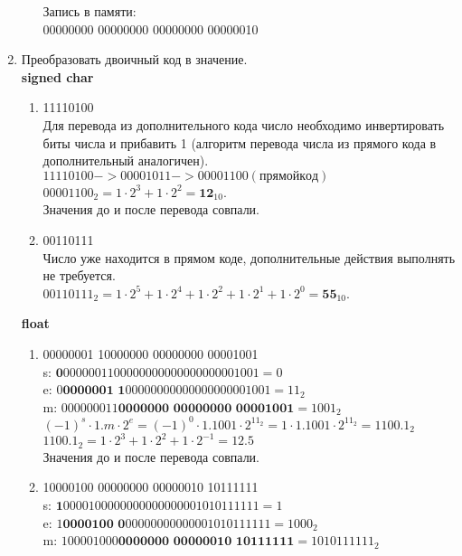 \documentclass[a4paper,14pt]{extarticle}
\begin{document}
\begin{enumerate}
\begin{enumerate}[1. ]
  Запись в памяти:\\
  00000000 00000000 00000000 00000010
\end{enumerate}
\item Преобразовать двоичный код в значение.\\
\textbf{signed char}
\begin{enumerate}[1. ]
  \item 11110100\\
  Для перевода из дополнительного кода число необходимо инвертировать биты числа и прибавить 1 (алгоритм перевода числа из прямого кода в дополнительный аналогичен).\\
  $11110100 -> 00001011 -> 00001100 (прямой код)$\\
  $00001100_2 = 1 \cdot 2 ^ 3 + 1 \cdot 2 ^ 2 = \textbf{12}_{10}$.\\
  Значения до и после перевода совпали.
  \item 00110111\\
  Число уже находится в прямом коде, дополнительные действия выполнять не требуется.\\
  $00110111_2 = 1 \cdot 2 ^ 5 + 1 \cdot 2 ^ 4 + 1 \cdot 2 ^ 2 + 1 \cdot 2 ^ 1 + 1 \cdot 2 ^ 0 = \textbf{55}_{10}$.\\
\end{enumerate}
\textbf{float}
\begin{enumerate}[1. ]
  \item 00000001 10000000 00000000 00001001\\
  s: $\textbf{0}0000001 10000000 00000000 00001001 = 0$\\
  e: $0\textbf{0000001 1}0000000 00000000 00001001 = 11_2$\\
  m: $00000001 1\textbf{0000000 00000000 00001001} = 1001_2$\\
  $(-1)^s \cdot 1.m \cdot 2^e = (-1)^0 \cdot 1.1001 \cdot 2^{11_2} = 1 \cdot 1.1001 \cdot 2^{11_2} = 1100.1_2$\\
  $1100.1_2 = 1 \cdot 2 ^ 3 + 1 \cdot 2 ^ 2 + 1 \cdot 2 ^ {-1} = 12.5$\\
  Значения до и после перевода совпали.
  \item 10000100 00000000 00000010 10111111\\
  s: $\textbf{1}0000100 00000000 00000010 10111111 = 1$\\
  e: $1\textbf{0000100 0}0000000 00000010 10111111 = 1000_2$\\
  m: $10000100 0\textbf{0000000 00000010 10111111} = 1010111111_2$\\

\end{enumerate}
\end{enumerate}
\end{document}
